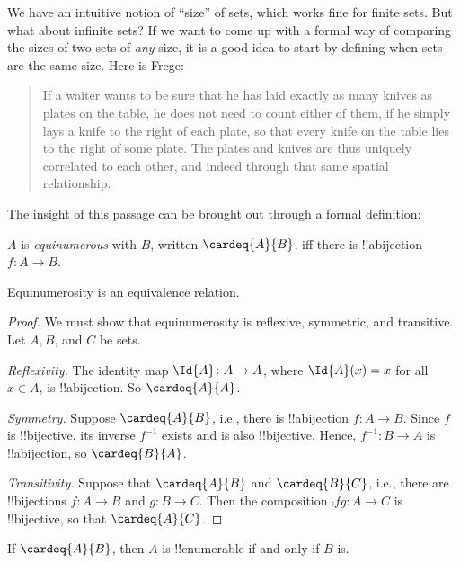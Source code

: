 \documentclass[../../../include/open-logic-section]{subfiles}
\begin{document}


We have an intuitive notion of ``size'' of sets, which works fine for
finite sets. But what about infinite sets? If we want to come up with
a formal way of comparing the sizes of two sets of \emph{any} size, it
is a good idea to start by defining when sets are the same size. Here
is Frege:
\begin{quote}
  If a waiter wants to be sure that he has laid exactly as many knives
  as plates on the table, he does not need to count either of them, if
  he simply lays a knife to the right of each plate, so that every
  knife on the table lies to the right of some plate. The plates and
  knives are thus uniquely correlated to each other, and indeed
  through that same spatial relationship. \citep[\S70]{Frege1884}
\end{quote}
The insight of this passage can be brought out through a formal
definition:

\begin{defn}
  $A$ is \emph{equinumerous} with $B$, written $\cardeq{A}{B}$, iff
  there is !!a{bijection} $f \colon A \to B$. 
\end{defn}

\begin{prop}
Equinumerosity is an equivalence relation.
\end{prop}

\begin{proof} 
We must show that equinumerosity is reflexive, symmetric, and
transitive. Let $A, B$, and $C$ be sets.

\emph{Reflexivity.} The identity map $\Id{A} \colon A \to A$, where
$\Id{A} (x) = x$ for all $x \in A$, is !!a{bijection}. So
$\cardeq{A}{A}$.

\emph{Symmetry.} Suppose $\cardeq{A}{B}$, i.e., there is
!!a{bijection} $f\colon A \to B$. Since $f$ is !!{bijective}, its
inverse $f^{-1}$ exists and is also !!{bijective}. Hence,
$f^{-1}\colon B \to A$ is !!a{bijection}, so $\cardeq{B}{A}$.

\emph{Transitivity.} Suppose that $\cardeq{A}{B}$ and $\cardeq{B}{C}$,
i.e., there are !!{bijection}s $f\colon A \to B$ and $g\colon B \to
C$. Then the composition $\comp{f}{g}\colon A \to C$ is !!{bijective},
so that $\cardeq{A}{C}$.
\end{proof}

\begin{prop}
If $\cardeq{A}{B}$, then $A$ is !!{enumerable} if
and only if $B$ is.
\end{prop}
\end{document}
